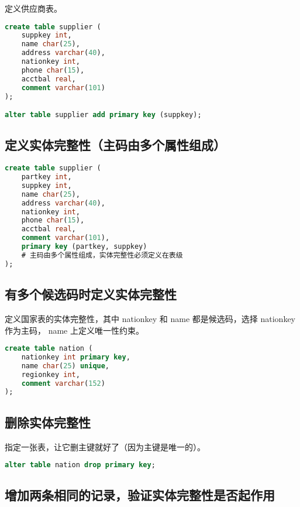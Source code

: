 \documentclass{article}
\begin{document}
定义供应商表。

\begin{lstlisting}[language=sql]
create table supplier (
	suppkey int,
    name char(25),
    address varchar(40),
    nationkey int,
    phone char(15),
    acctbal real,
    comment varchar(101)
);

alter table supplier add primary key (suppkey);
\end{lstlisting}

\subsection{定义实体完整性（主码由多个属性组成）}

\begin{lstlisting}[language=sql]
create table supplier (
	partkey int,
	suppkey int,
    name char(25),
    address varchar(40),
    nationkey int,
    phone char(15),
    acctbal real,
    comment varchar(101),
    primary key (partkey, suppkey)
    # 主码由多个属性组成，实体完整性必须定义在表级
);
\end{lstlisting}

\subsection{有多个候选码时定义实体完整性}

定义国家表的实体完整性，其中 nationkey 和 name 都是候选码，选择 nationkey 作为主码， name 上定义唯一性约束。

\begin{lstlisting}[language=sql]
create table nation (
	nationkey int primary key,
    name char(25) unique,
    regionkey int,
    comment varchar(152)
);
\end{lstlisting}

\subsection{删除实体完整性}

指定一张表，让它删主键就好了（因为主键是唯一的）。

\begin{lstlisting}[language=sql]
alter table nation drop primary key;
\end{lstlisting}

\subsection{增加两条相同的记录，验证实体完整性是否起作用}
\end{document}
